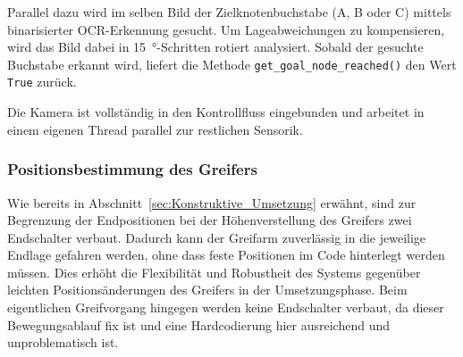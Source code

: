 \documentclass[main.tex]{subfiles} %
\begin{document}
Parallel dazu wird im selben Bild der Zielknotenbuchstabe (A, B oder C) mittels 
binarisierter OCR-Erkennung gesucht. Um Lageabweichungen zu kompensieren, wird 
das Bild dabei in \SI{15}{\degree}-Schritten rotiert analysiert. Sobald der 
gesuchte Buchstabe erkannt wird, liefert die Methode \texttt{get\_goal\_node\_reached()} 
den Wert \texttt{True} zurück.

Die Kamera ist vollständig in den Kontrollfluss eingebunden und arbeitet in einem 
eigenen Thread parallel zur restlichen Sensorik.


\subsubsection*{Positionsbestimmung des Greifers}
Wie bereits in Abschnitt~\ref{sec:Konstruktive_Umsetzung} erwähnt, sind zur Begrenzung der Endpositionen bei der
Höhenverstellung des Greifers zwei Endschalter verbaut. Dadurch kann der Greifarm zuverlässig in die jeweilige Endlage
gefahren werden, ohne dass feste Positionen im Code hinterlegt werden müssen. Dies erhöht die Flexibilität und Robustheit
des Systems gegenüber leichten Positionsänderungen des Greifers in der Umsetzungsphase. Beim eigentlichen Greifvorgang hingegen werden keine Endschalter
verbaut, da dieser Bewegungsablauf fix ist und eine Hardcodierung hier ausreichend und unproblematisch ist.
\end{document}
